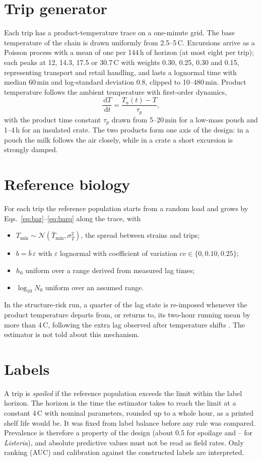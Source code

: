 \documentclass[11pt,a4paper,twoside,openany]{book}
\newcommand{\dd}{\,\mathrm{d}}
\newcommand{\degC}{\,\textdegree C}
\theoremstyle{plain}\newtheorem{proposition}{Proposition}\newtheorem{corollary}{Corollary}
\theoremstyle{definition}\newtheorem{definition}{Definition}[chapter]
\begin{document}
\section{Trip generator}
Each trip has a product-temperature trace on a one-minute grid. The base temperature of the chain is drawn uniformly from 2.5--5\degC. Excursions arrive as a Poisson process with a mean of one per 144\,h of horizon (at most eight per trip); each peaks at 12, 14.3, 17.5 or 30.7\degC{} with weights 0.30, 0.25, 0.30 and 0.15, representing transport and retail handling, and lasts a lognormal time with median 60\,min and log-standard deviation 0.8, clipped to 10--480\,min. Product temperature follows the ambient temperature with first-order dynamics,
\begin{equation}
\frac{\dd T}{\dd t}=\frac{T_a(t)-T}{\tau_p},
\end{equation}
with the product time constant $\tau_p$ drawn from 5--20\,min for a low-mass pouch and 1--4\,h for an insulated crate. The two products form one axis of the design: in a pouch the milk follows the air closely, while in a crate a short excursion is strongly damped.

\section{Reference biology}
For each trip the reference population starts from a random load and grows by Eqs.~\eqref{eq:bar}--\eqref{eq:barq} along the trace, with
\begin{itemize}
\item $T_{\min}\sim\mathcal N(\bar T_{\min},\sigma_T^2)$, the spread between strains and trips;
\item $b=\bar b\,\varepsilon$ with $\varepsilon$ lognormal with coefficient of variation $cv\in\{0,0.10,0.25\}$;
\item $h_0$ uniform over a range derived from measured lag times;
\item $\log_{10}N_0$ uniform over an assumed range.
\end{itemize}
In the structure-risk run, a quarter of the lag state is re-imposed whenever the product temperature departs from, or returns to, its two-hour running mean by more than 4\degC, following the extra lag observed after temperature shifts \cite{zwietering1994}. The estimator is not told about this mechanism.

\section{Labels}
A trip is \emph{spoiled} if the reference population exceeds the limit within the label horizon. The horizon is the time the estimator takes to reach the limit at a constant 4\degC{} with nominal parameters, rounded up to a whole hour, as a printed shelf life would be. It was fixed from label balance before any rule was compared. Prevalence is therefore a property of the design (about 0.5 for spoilage and \NumLisPrevMin--\NumLisPrevMax{} for \textit{Listeria}), and absolute predictive values must not be read as field rates. Only ranking (AUC) and calibration against the constructed labels are interpreted.
\end{document}
